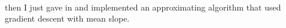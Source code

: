 \documentclass[10pt]{article}
\DeclareMathOperator{\Lspline}{L}
\DeclareMathOperator{\nLspline}{nL}
\begin{document}
$$\begin{aligned}
    \end{aligned}$$
    then I just gave in and implemented an approximating algorithm that used gradient descent with mean slope.
\end{document}
